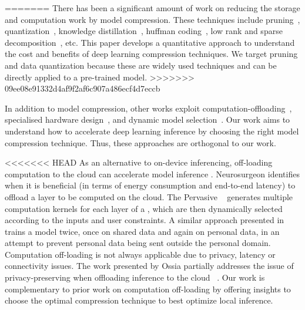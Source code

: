 =======
There has been a significant amount of work on reducing the storage and computation work by model compression. These techniques include
pruning~\cite{}, quantization~\cite{}, knowledge distillation~\cite{}, huffman coding~\cite{}, low rank and sparse decomposition~\cite{},
etc. This paper develops a quantitative approach to understand the cost and benefits of deep learning compression techniques. We target
pruning and data quantization because these are widely used techniques and can be directly applied to a pre-trained model.
>>>>>>> 09ee08e91332d4af9f2af6c907a486ecf4d7eccb


In addition to model compression, other works exploit computation-offloading~\cite{teerapittayanon2017distributed,Kang2017neurosurgeon},
specialised hardware design~\cite{chen2017eyeriss,Han:2016:EEI:3001136.3001163}, and dynamic model
selection~\cite{Taylor:2018:ADL:3211332.3211336}. Our work aims to understand how to accelerate deep learning inference by choosing the
right model compression technique. Thus, these approaches are orthogonal to our work.


<<<<<<< HEAD
As an alternative to on-device inferencing, off-loading computation to the cloud can accelerate \DNN model inference
\cite{teerapittayanon2017distributed}. Neurosurgeon \cite{Kang2017neurosurgeon} identifies when it is beneficial (\eg in terms of energy
consumption and end-to-end latency) to offload a \DNN layer to be computed on the cloud. The Pervasive \CNN~\cite{song2017towards} generates
multiple computation kernels for each layer of a \CNN, which are then dynamically selected according to the inputs and user constraints. A
similar approach presented in \cite{servia2017personal} trains a model twice, once on shared data and again on personal data, in an attempt to
prevent personal data being sent outside the personal domain. Computation off-loading is not always applicable due to privacy, latency or
connectivity issues. The work presented by Ossia \etal partially addresses the issue of privacy-preserving when offloading \DNN inference
to the cloud ~\cite{osia2017hybrid}. Our work is complementary to prior work on computation off-loading by offering insights to choose the
optimal compression technique to best optimize local inference.


